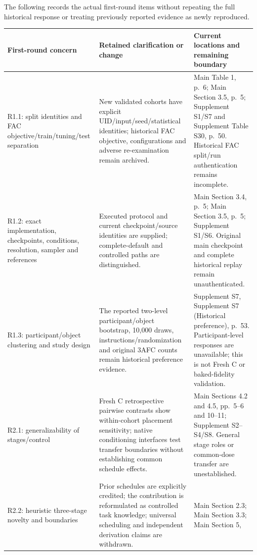 \documentclass[
  10pt,
]{article}
\begin{document}
The following records the actual first-round items without repeating the
full historical response or treating previously reported evidence as
newly reproduced.

\begin{longtable}[]{@{}
  >{\raggedright\arraybackslash}p{}
  >{\raggedright\arraybackslash}p{}
  >{\raggedright\arraybackslash}p{}@{}}
\toprule
First-round concern & Retained clarification or change & Current
locations and remaining boundary \\
\midrule
\endhead
R1.1: split identities and FAC objective/train/tuning/test separation &
New validated cohorts have explicit UID/input/seed/statistical
identities; historical FAC objective, configurations and adverse
re-examination remain archived. & Main Table 1, p.~6; Main Section 3.5,
p.~5; Supplement S1/S7 and Supplement Table S30, p.~50. Historical FAC
split/run authentication remains incomplete. \\
R1.2: exact implementation, checkpoints, conditions, resolution, sampler
and references & Executed protocol and current checkpoint/source
identities are supplied; complete-default and controlled paths are
distinguished. & Main Section 3.4, p.~5; Main Section 3.5, p.~5;
Supplement S1/S6. Original main checkpoint and complete historical
replay remain unauthenticated. \\
R1.3: participant/object clustering and study design & The reported
two-level participant/object bootstrap, 10,000 draws,
instructions/randomization and original 3AFC counts remain historical
preference evidence. & Supplement S7, Supplement S7 (Historical
preference), p.~53. Participant-level responses are unavailable; this is
not Fresh C or baked-fidelity validation. \\
R2.1: generalizability of stages/control & Fresh C retrospective
pairwise contrasts show within-cohort placement sensitivity; native
conditioning interfaces test transfer boundaries without establishing
common schedule effects. & Main Sections 4.2 and 4.5, pp.~5--6 and
10--11; Supplement S2--S4/S8. General stage roles or common-dose
transfer are unestablished. \\
R2.2: heuristic three-stage novelty and boundaries & Prior schedules are
explicitly credited; the contribution is reformulated as controlled task
knowledge; universal scheduling and independent derivation claims are
withdrawn. & Main Section 2.3; Main Section 3.3; Main Section 5,

\end{longtable}
\end{document}
